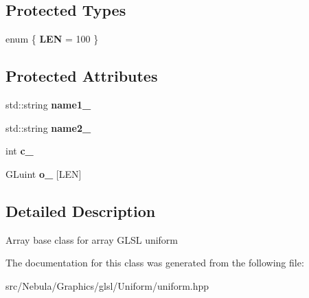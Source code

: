 \subsection*{\-Protected \-Types}
\begin{DoxyCompactItemize}
\item 
enum \{ {\bfseries \-L\-E\-N} =  100
 \}
\end{DoxyCompactItemize}
\subsection*{\-Protected \-Attributes}
\begin{DoxyCompactItemize}
\item 
\hypertarget{classNeb_1_1glsl_1_1Uniform_1_1Vector_1_1Base_a78a4f2843f5c87f11d67b5a29c95d6c2}{std\-::string {\bfseries name1\-\_\-}}\label{classNeb_1_1glsl_1_1Uniform_1_1Vector_1_1Base_a78a4f2843f5c87f11d67b5a29c95d6c2}

\item 
\hypertarget{classNeb_1_1glsl_1_1Uniform_1_1Vector_1_1Base_a2080091cb0f43f60e48f7c667cc3d65b}{std\-::string {\bfseries name2\-\_\-}}\label{classNeb_1_1glsl_1_1Uniform_1_1Vector_1_1Base_a2080091cb0f43f60e48f7c667cc3d65b}

\item 
\hypertarget{classNeb_1_1glsl_1_1Uniform_1_1Vector_1_1Base_adada72e697489b74dcca62bd2a6404d1}{int {\bfseries c\-\_\-}}\label{classNeb_1_1glsl_1_1Uniform_1_1Vector_1_1Base_adada72e697489b74dcca62bd2a6404d1}

\item 
\hypertarget{classNeb_1_1glsl_1_1Uniform_1_1Vector_1_1Base_a3e462add25f07b5e7b2815179f928b76}{\-G\-Luint {\bfseries o\-\_\-} \mbox{[}\-L\-E\-N\mbox{]}}\label{classNeb_1_1glsl_1_1Uniform_1_1Vector_1_1Base_a3e462add25f07b5e7b2815179f928b76}

\end{DoxyCompactItemize}


\subsection{\-Detailed \-Description}
\-Array base class for array \-G\-L\-S\-L uniform 

\-The documentation for this class was generated from the following file\-:\begin{DoxyCompactItemize}
\item 
src/\-Nebula/\-Graphics/glsl/\-Uniform/uniform.\-hpp\end{DoxyCompactItemize}
